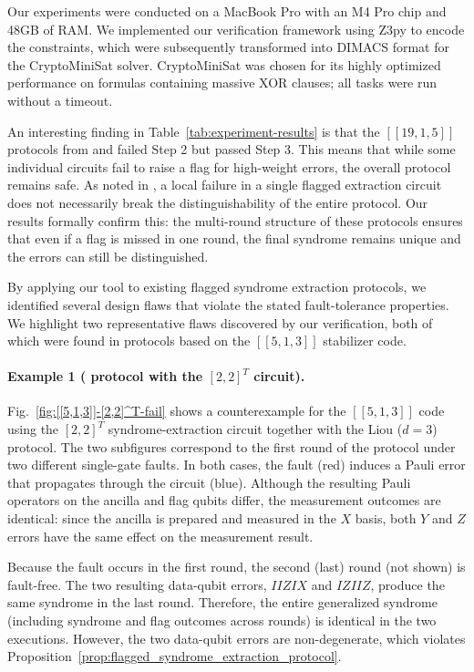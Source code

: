 \documentclass[acmsmallw,review]{acmart}
\begin{document}
Our experiments were conducted on a MacBook Pro with an M4 Pro chip and 48GB of RAM. We implemented our verification framework using Z3py to encode the constraints, which were subsequently transformed into DIMACS format for the CryptoMiniSat solver. CryptoMiniSat was chosen for its highly optimized performance on formulas containing massive XOR clauses; all tasks were run without a timeout. 

An interesting finding in Table~\ref{tab:experiment-results} is that the $[[19,1,5]]$ protocols from \cite{Liou25} and \cite{Du24} failed Step 2 but passed Step 3. This means that while some individual circuits fail to raise a flag for high-weight errors, the overall protocol remains safe. As noted in \cite{Liou25, Du24}, a local failure in a single flagged extraction circuit does not necessarily break the distinguishability of the entire protocol. Our results formally confirm this: the multi-round structure of these protocols ensures that even if a flag is missed in one round, the final syndrome remains unique and the errors can still be distinguished.


By applying our tool to existing flagged syndrome extraction protocols, we identified several design flaws that violate the stated fault-tolerance properties. We highlight two representative flaws discovered by our verification, both of which were found in protocols based on the $[[5,1,3]]$ stabilizer code. 

\paragraph{Example 1 (\cite{Liou25} protocol with the $[2,2]^T$ circuit).}
Fig.~\ref{fig:[[5,1,3]]-[2,2]^T-fail} shows a counterexample for the $[[5,1,3]]$
code using the $[2,2]^T$ syndrome-extraction circuit together with the Liou
($d=3$) protocol. The two subfigures correspond to the first round of the
protocol under two different single-gate faults. In both cases, the fault (red)
induces a Pauli error that propagates through the circuit (blue). Although the
resulting Pauli operators on the ancilla and flag qubits differ, the measurement
outcomes are identical: since the ancilla is prepared and measured in the $X$
basis, both $Y$ and $Z$ errors have the same effect on the measurement result.

Because the fault occurs in the first round, the second (last) round (not shown) is
fault-free. The two resulting data-qubit errors, $IIZIX$ and $IZIIZ$, produce the
same syndrome in the last round. Therefore, the entire generalized
syndrome (including syndrome and flag outcomes across rounds) is identical in
the two executions. However, the two data-qubit errors are non-degenerate, which
violates Proposition~\ref{prop:flagged_syndrome_extraction_protocol}.
\end{document}
